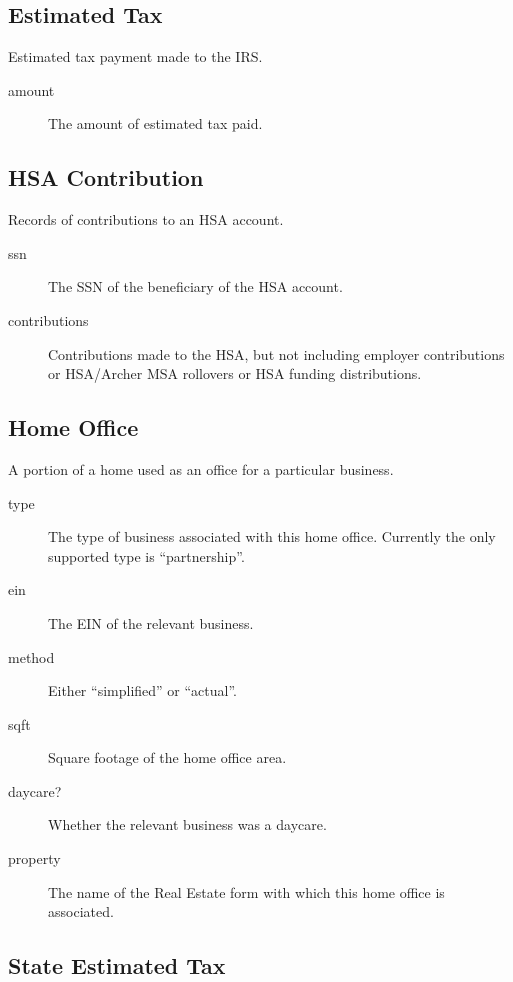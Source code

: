 \subsection{Estimated Tax}

Estimated tax payment made to the IRS.

\begin{description}
\item[amount] The amount of estimated tax paid.
\end{description}

\subsection{HSA Contribution}

Records of contributions to an HSA account.

\begin{description}
\item[ssn] The SSN of the beneficiary of the HSA account.
\item[contributions] Contributions made to the HSA, but not including employer
contributions or HSA/Archer MSA rollovers or HSA funding distributions.
\end{description}

\subsection{Home Office}

A portion of a home used as an office for a particular business.

\begin{description}
\item[type] The type of business associated with this home office. Currently the
only supported type is ``partnership''.
\item[ein] The EIN of the relevant business.
\item[method] Either ``simplified'' or ``actual''.
\item[sqft] Square footage of the home office area.
\item[daycare?] Whether the relevant business was a daycare.
\item[property] The name of the Real Estate form with which this home office is
associated.
\end{description}

\subsection{State Estimated Tax}

